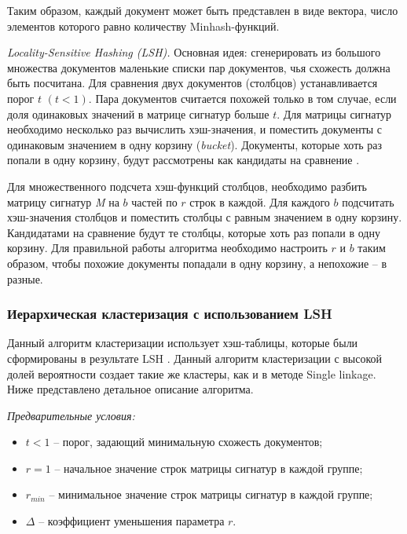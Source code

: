 Таким образом, каждый документ может быть представлен в виде вектора, число элементов которого равно количеству Minhash-функций.

\textit{Locality-Sensitive Hashing (LSH).} Основная идея: сгенерировать из большого множества документов маленькие списки пар документов, чья схожесть должна быть посчитана. Для сравнения двух документов (столбцов) устанавливается порог \(t\) \((t < 1)\). Пара документов считается похожей только в том случае, если доля одинаковых значений в матрице сигнатур больше \(t\). Для матрицы сигнатур необходимо несколько раз вычислить хэш-значения, и поместить документы с одинаковым значением в одну корзину (\textit{bucket}). Документы, которые хоть раз попали в одну корзину, будут рассмотрены как кандидаты на сравнение \cite{GionisIndykMotwani}.

Для множественного подсчета хэш-функций столбцов, необходимо разбить матрицу сигнатур \textit{M} на \(b\) частей по \(r\) строк в каждой. Для каждого \(b\) подсчитать хэш-значения столбцов и поместить столбцы с равным значением в одну корзину. Кандидатами на сравнение будут те столбцы, которые хоть раз попали в одну корзину. Для правильной работы алгоритма необходимо настроить \(r\) и \(b\) таким образом, чтобы похожие документы попадали в одну корзину, а непохожие -- в разные.

\subsubsection{Иерархическая кластеризация с использованием LSH}

Данный алгоритм кластеризации использует хэш-таблицы, которые были сформированы в результате LSH \cite{KogaIshibashiWatanabe}. Данный алгоритм кластеризации с высокой долей вероятности создает такие же кластеры, как и в методе Single linkage. Ниже представлено детальное описание алгоритма.

\textit{Предварительные условия:}
\begin{itemize}
	\item \(t < 1\) -- порог, задающий минимальную схожесть документов;
	\item \(r = 1\) -- начальное значение строк матрицы сигнатур в каждой группе;
	\item \(r_\textit{min}\) -- минимальное значение строк матрицы сигнатур в каждой группе;
	\item \(\Delta\) -- коэффициент уменьшения параметра \(r\).
\end{itemize}

